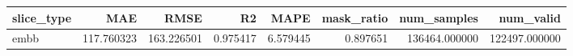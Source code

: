 \begin{tabular}{lrrrrrrr}
\toprule
slice_type & MAE & RMSE & R2 & MAPE & mask_ratio & num_samples & num_valid \\
\midrule
embb & 117.760323 & 163.226501 & 0.975417 & 6.579445 & 0.897651 & 136464.000000 & 122497.000000 \\
\bottomrule
\end{tabular}
